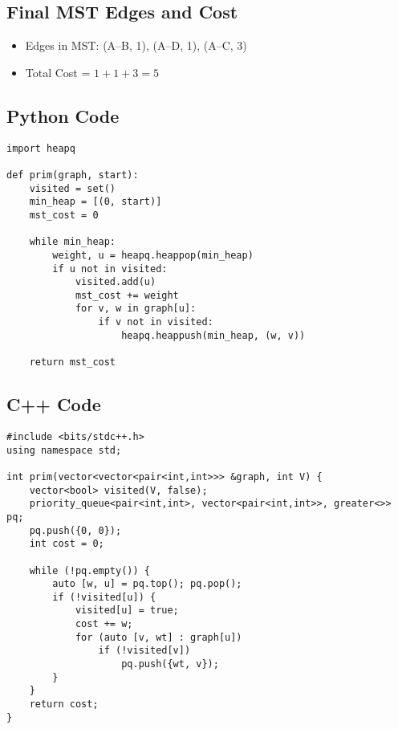 \documentclass[14pt,a4paper]{extarticle}
\begin{document}
\subsection*{Final MST Edges and Cost}

\begin{itemize}
    \item Edges in MST: (A–B, 1), (A–D, 1), (A–C, 3)
    \item Total Cost = $1 + 1 + 3 = 5$
\end{itemize}

\newpage
\subsection{Python Code}
\begin{lstlisting}[style=python, caption={Prim's Algorithm in Python}]
import heapq

def prim(graph, start):
    visited = set()
    min_heap = [(0, start)]
    mst_cost = 0

    while min_heap:
        weight, u = heapq.heappop(min_heap)
        if u not in visited:
            visited.add(u)
            mst_cost += weight
            for v, w in graph[u]:
                if v not in visited:
                    heapq.heappush(min_heap, (w, v))

    return mst_cost
\end{lstlisting}

\subsection{C++ Code}
\begin{lstlisting}[style=cpp, caption={Prim's Algorithm in C++}]
#include <bits/stdc++.h>
using namespace std;

int prim(vector<vector<pair<int,int>>> &graph, int V) {
    vector<bool> visited(V, false);
    priority_queue<pair<int,int>, vector<pair<int,int>>, greater<>> pq;
    pq.push({0, 0});
    int cost = 0;

    while (!pq.empty()) {
        auto [w, u] = pq.top(); pq.pop();
        if (!visited[u]) {
            visited[u] = true;
            cost += w;
            for (auto [v, wt] : graph[u])
                if (!visited[v])
                    pq.push({wt, v});
        }
    }
    return cost;
}
\end{lstlisting}

\newpage
\end{document}
